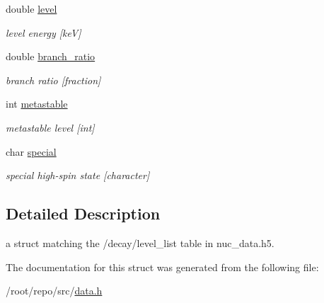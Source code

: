 \begin{DoxyCompactItemize}
double \hyperlink{structpyne_1_1level__data_af029059b5f79cfa2ad22e6f9fcb04ac9}{level}
\begin{DoxyCompactList}\small\item\em level energy \mbox{[}keV\mbox{]} \end{DoxyCompactList}\item 
\mbox{\label{structpyne_1_1level__data_a5ce97c540e0ce558156e5a43510a4633}} 
double \hyperlink{structpyne_1_1level__data_a5ce97c540e0ce558156e5a43510a4633}{branch\+\_\+ratio}
\begin{DoxyCompactList}\small\item\em branch ratio \mbox{[}fraction\mbox{]} \end{DoxyCompactList}\item 
\mbox{\label{structpyne_1_1level__data_a7a71068eed39597f007cc6624727e954}} 
int \hyperlink{structpyne_1_1level__data_a7a71068eed39597f007cc6624727e954}{metastable}
\begin{DoxyCompactList}\small\item\em metastable level \mbox{[}int\mbox{]} \end{DoxyCompactList}\item 
\mbox{\label{structpyne_1_1level__data_acabc31aa71741dbc2ea5485ca51da0d6}} 
char \hyperlink{structpyne_1_1level__data_acabc31aa71741dbc2ea5485ca51da0d6}{special}
\begin{DoxyCompactList}\small\item\em special high-\/spin state \mbox{[}character\mbox{]} \end{DoxyCompactList}\end{DoxyCompactItemize}


\subsection{Detailed Description}
a struct matching the \textquotesingle{}/decay/level\+\_\+list\textquotesingle{} table in nuc\+\_\+data.\+h5. 

The documentation for this struct was generated from the following file\+:\begin{DoxyCompactItemize}
\item 
/root/repo/src/\hyperlink{data_8h}{data.\+h}\end{DoxyCompactItemize}
